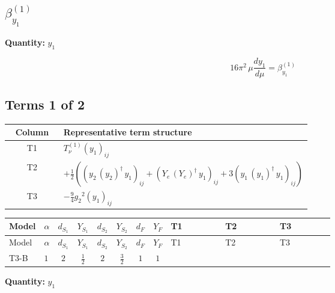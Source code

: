 \documentclass[8pt]{article}
\begin{document}
\begin{landscape}
\section*{$\beta_{y_1}^{(1)}$}
\noindent\textbf{Quantity: }$y_1$\par\smallskip
\[16\pi^2\,\mu\frac{d y_1}{d\mu}=\beta_{y_1}^{(1)}\]
\subsection*{Terms 1 of 2}
\begin{center}
\begin{tabular}{@{}c >{\raggedright\arraybackslash}p{0.82\linewidth}@{}}
\toprule
Column & Representative term structure \\
\midrule
T1 & \(\displaystyle T_{\nu}^{(1)} \left({y_1}\right)_{ij}\) \\
\midrule
T2 & \(\displaystyle +\frac{1}{2} (\left({y_2}\,\left({y_2}\right)^{\dagger}\,{y_1}\right)_{ij}+\left({Y_e}\,\left({Y_e}\right)^{\dagger}\,{y_1}\right)_{ij}+3 \left({y_1}\,\left({y_1}\right)^{\dagger}\,{y_1}\right)_{ij})\) \\
\midrule
T3 & \(\displaystyle -\frac{9}{4} {g_2}^2 \left({y_1}\right)_{ij}\) \\
\midrule
\bottomrule
\end{tabular}
\end{center}
\smallskip
\tiny
\begin{longtable}{@{}llcccccc >{\raggedright\arraybackslash}p{0.21\linewidth} >{\raggedright\arraybackslash}p{0.21\linewidth} >{\raggedright\arraybackslash}p{0.21\linewidth}@{}}
\toprule
Model & $\alpha$ & $d_{S_1}$ & $Y_{S_1}$ & $d_{S_2}$ & $Y_{S_2}$ & $d_F$ & $Y_F$ & T1 & T2 & T3 \\
\midrule
\endfirsthead
\toprule
Model & $\alpha$ & $d_{S_1}$ & $Y_{S_1}$ & $d_{S_2}$ & $Y_{S_2}$ & $d_F$ & $Y_F$ & T1 & T2 & T3 \\
\midrule
\endhead
T3-B & $1$ & $2$ & $\frac{1}{2}$ & $2$ & $\frac{3}{2}$ & $1$ & $1$ & \scriptsize\adjustbox{max width=\linewidth}{$\begin{gathered} T_{\nu}^{(1)} \left({y_1}\right)_{ij}\end{gathered}$} & \scriptsize\adjustbox{max width=\linewidth}{$\begin{gathered} +\frac{1}{2} (\left({y_2}\,\left({y_2}\right)^{\dagger}\,{y_1}\right)_{ij}+\left({Y_e}\,\left({Y_e}\right)^{\dagger}\,{y_1}\right)_{ij}+3 \left({y_1}\,\left({y_1}\right)^{\dagger}\,{y_1}\right)_{ij})\end{gathered}$} & \scriptsize\adjustbox{max width=\linewidth}{$\begin{gathered} -\frac{9}{4} {g_2}^2 \left({y_1}\right)_{ij}\end{gathered}$} \\
\midrule
\bottomrule
\end{longtable}
\clearpage
\noindent\textbf{Quantity: }$y_1$\par\smallskip

\end{landscape}
\end{document}
